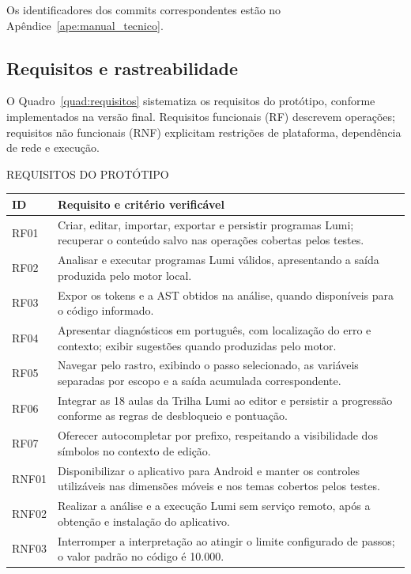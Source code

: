 \documentclass[
    12pt
    ,oneside
    ,a4paper
    ,chapter=TITLE
    ,section=TITLE
    ,sumario=abnt-6027-2012]{abntex2}
\renewcommand{\legenda}[2][]{%
    \centering
    \caption[\MakeTextUppercase{#2}]{\maybeLabel{#1}\MakeTextUppercase{#2}}%
}
\begin{document}
Os identificadores dos commits correspondentes estão no
Apêndice~\ref{ape:manual_tecnico}.

\subsection{Requisitos e rastreabilidade}
\label{sec:requisitos_rastreabilidade}

O Quadro~\ref{quad:requisitos} sistematiza os requisitos do protótipo,
conforme implementados na versão final. Requisitos funcionais
(RF) descrevem operações; requisitos não funcionais (RNF) explicitam restrições
de plataforma, dependência de rede e execução.

\begin{quadro}[htb]
\centering
\legenda[quad:requisitos]{Requisitos do protótipo}
\footnotesize
\begin{tabular}{|P{1.4cm}|P{11.7cm}|}
\hline
ID & Requisito e critério verificável \\
\hline\hline
RF01 & Criar, editar, importar, exportar e persistir programas Lumi; recuperar o conteúdo salvo nas operações cobertas pelos testes. \\
\hline
RF02 & Analisar e executar programas Lumi válidos, apresentando a saída produzida pelo motor local. \\
\hline
RF03 & Expor os tokens e a AST obtidos na análise, quando disponíveis para o código informado. \\
\hline
RF04 & Apresentar diagnósticos em português, com localização do erro e contexto; exibir sugestões quando produzidas pelo motor. \\
\hline
RF05 & Navegar pelo rastro, exibindo o passo selecionado, as variáveis separadas por escopo e a saída acumulada correspondente. \\
\hline
RF06 & Integrar as 18 aulas da Trilha Lumi ao editor e persistir a progressão conforme as regras de desbloqueio e pontuação. \\
\hline
RF07 & Oferecer autocompletar por prefixo, respeitando a visibilidade dos símbolos no contexto de edição. \\
\hline
RNF01 & Disponibilizar o aplicativo para Android e manter os controles utilizáveis nas dimensões móveis e nos temas cobertos pelos testes. \\
\hline
RNF02 & Realizar a análise e a execução Lumi sem serviço remoto, após a obtenção e instalação do aplicativo. \\
\hline
RNF03 & Interromper a interpretação ao atingir o limite configurado de passos; o valor padrão no código é 10.000. \\
\hline
\end{tabular}
\vspace{0.2cm}
\end{quadro}
\FloatBarrier
\end{document}
